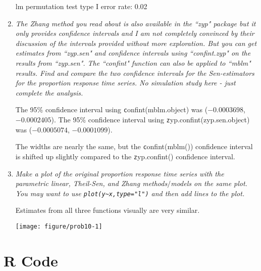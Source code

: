 \documentclass[11pt]{article}\usepackage[]{graphicx}\usepackage[]{color}
\makeatletter
\def\maxwidth{ %
  \ifdim\Gin@nat@width>\linewidth
    \linewidth
  \else
    \Gin@nat@width
  \fi
}
\newenvironment{knitrout}{}{} %
\makeatother
\begin{document}
\begin{enumerate}
lm permutation test type I error rate: 0.02

\item%
{\it The Zhang method you read about is also available in the ``zyp" package but it only provides confidence intervals and I am not completely convinced by their discussion of the intervals provided without more exploration. But you can get estimates from ``zyp.sen" and confidence intervals using ``confint.zyp" on the results from ``zyp.sen". The ``confint" function can also be applied to ``mblm" results. Find and compare the two confidence intervals for the Sen-estimators for the proportion response time series. No simulation study here - just complete the analysis.}





The 95\% confidence interval using {\texttt confint(mblm.object)} was (\ensuremath{-0.0003698}, \ensuremath{-0.0002405}).
The 95\% confidence interval using {\texttt zyp.confint(zyp.sen.object)} was (\ensuremath{-0.0005074}, \ensuremath{-0.0001099}).

The widths are nearly the same, but the {\texttt confint(mblm())} confidence interval is shifted up slightly compared to the {\texttt zyp.confint()} confidence interval.


\item%
{\it Make a plot of the original proportion response time series with the parametric linear, Theil-Sen, and Zhang methods$/$models on the same plot. You may want to use \verb|plot(y~x,type="l")| and then add lines to the plot.}

Estimates from all three functions visually are very similar.


\begin{knitrout}\footnotesize
{}\color{fgcolor}

{\centering \texttt{[image: figure/prob10-1]} 

}



\end{knitrout}



\end{enumerate}

\appendix
\section*{R Code}
\end{document}
